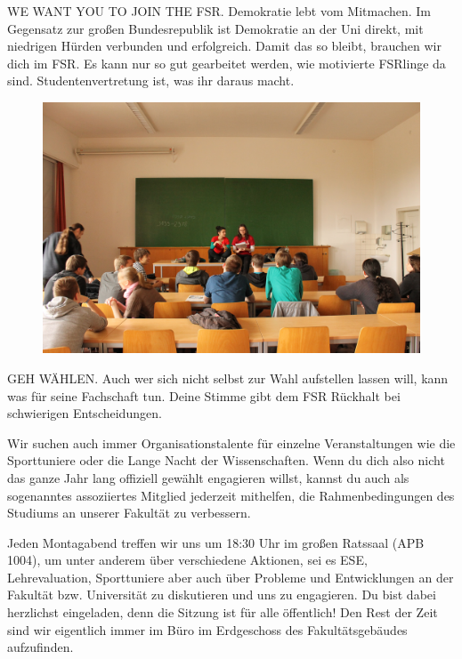 WE WANT YOU TO JOIN THE FSR.
Demokratie lebt vom Mitmachen.
Im Gegensatz zur großen Bundesrepublik ist Demokratie an der Uni direkt, mit niedrigen Hürden verbunden und erfolgreich.
Damit das so bleibt, brauchen wir dich im FSR.
Es kann nur so gut gearbeitet werden, wie motivierte FSRlinge da sind.
Studentenvertretung ist, was ihr daraus macht.

\begin{figure}
\includegraphics[width=\linewidth]{img/ese2013/tutorium.jpg}
\end{figure}

GEH WÄHLEN.
Auch wer sich nicht selbst zur Wahl aufstellen lassen will, kann was für seine Fachschaft tun.
Deine Stimme gibt dem FSR Rückhalt bei schwierigen Entscheidungen.

Wir suchen auch immer Organisationstalente für einzelne Veranstaltungen wie die Sporttuniere oder die Lange Nacht der Wissenschaften.
Wenn du dich also nicht das ganze Jahr lang offiziell gewählt engagieren willst, kannst du auch als sogenanntes assoziiertes Mitglied jederzeit mithelfen, die Rahmenbedingungen des Studiums an unserer Fakultät zu verbessern.

Jeden Montagabend treffen wir uns um 18:30 Uhr im großen Ratssaal (APB 1004), um unter anderem über verschiedene Aktionen, sei es ESE, Lehrevaluation, Sporttuniere aber auch über Probleme und Entwicklungen an der Fakultät bzw. Universität zu diskutieren und uns zu engagieren.
Du bist dabei herzlichst eingeladen, denn die Sitzung ist für alle öffentlich!
Den Rest der Zeit sind wir eigentlich immer im Büro im Erdgeschoss des Fakultätsgebäudes aufzufinden.


